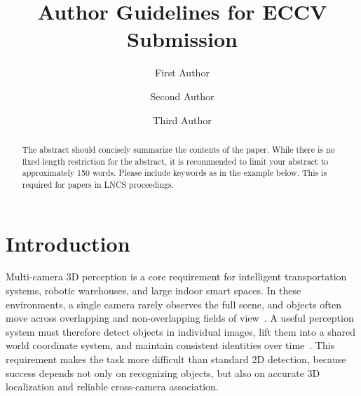 \documentclass[runningheads]{llncs}
\begin{document}
\title{Author Guidelines for ECCV Submission} 


\author{First Author \and
Second Author \and
Third Author}



\maketitle


\begin{abstract}
  The abstract should concisely summarize the contents of the paper. 
  While there is no fixed length restriction for the abstract, it is recommended to limit your abstract to approximately 150 words.
  Please include keywords as in the example below. 
  This is required for papers in LNCS proceedings.
\end{abstract}


\section{Introduction}
\label{sec:intro}

Multi-camera 3D perception is a core requirement for intelligent transportation
systems, robotic warehouses, and large indoor smart spaces. In these environments,
a single camera rarely observes the full scene, and objects often move across
overlapping and non-overlapping fields of view~\cite{tang2019cityflow,chavdarova2018wildtrack}.
A useful perception system must therefore detect objects in individual images,
lift them into a shared world coordinate system, and maintain consistent identities
over time~\cite{hou2020mvdet,hou2021mvdetr,wang2024bevsushi}. This requirement
makes the task more difficult than standard 2D detection, because success depends
not only on recognizing objects, but also on accurate 3D localization and reliable
cross-camera association.
\end{document}

